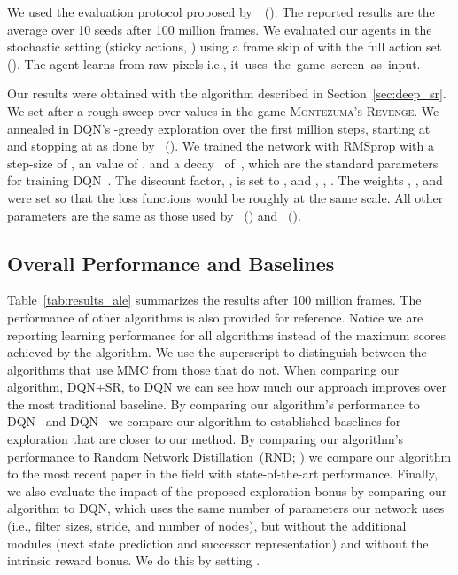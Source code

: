 \documentclass[letterpaper]{article} \usepackage{aaai20}  \usepackage{times}  \usepackage{helvet} \usepackage{courier}  \usepackage[hyphens]{url}  \usepackage{graphicx} \urlstyle{rm} \def\UrlFont{\rm}  \usepackage{graphicx}  \frenchspacing  \setlength{\pdfpagewidth}{8.5in}  \setlength{\pdfpageheight}{11in}  \usepackage{booktabs}
\begin{document}
We used the evaluation protocol proposed by~\citeauthor{Machado18a}~(\citeyear{Machado18a}). The reported results are the average over 10 seeds after 100 million frames. We evaluated our agents in the stochastic setting (sticky actions, ) using a frame skip of  with the full action set (). The agent learns from raw pixels i.e., it~uses~the~game~screen~as~input.

Our results were obtained with the algorithm described in Section~\ref{sec:deep_sr}. We set  after a rough sweep over values in the game \textsc{Montezuma's Revenge}. We annealed  in DQN's -greedy exploration over the first million steps, starting at  and stopping at  as done by \citeauthor{Bellemare16}~(\citeyear{Bellemare16}). We trained the network with RMSprop with a step-size of , an  value of , and a decay~ of~, which are the standard parameters for training DQN~\cite{Mnih15}. The discount factor, , is set to , and , , . The weights  , , and  were set so that the loss functions would be roughly at the same scale. All other parameters are the same as those used by \citeauthor{Mnih15}~(\citeyear{Mnih15}) and \citeauthor{Oh15}~(\citeyear{Oh15}).

\subsection{Overall Performance and Baselines}

Table~\ref{tab:results_ale} summarizes the results after 100 million frames. The performance of other algorithms is also provided for reference. Notice we are reporting learning performance for all algorithms instead of the maximum scores achieved by the algorithm. We use the superscript  to distinguish between the algorithms that use MMC from those that do not. When comparing our algorithm, DQN+SR, to DQN we can see how much our approach improves over the most traditional baseline. By comparing our algorithm's performance to \textsc{DQN}~\cite{Bellemare16} and \textsc{DQN}~\cite{Ostrovski17} we compare our algorithm to established baselines for exploration that are closer to our method. By comparing our algorithm's performance to Random Network Distillation~(RND; \citeauthor{Burda19} \citeyear{Burda19}) we compare our algorithm to the most recent paper in the field with state-of-the-art performance. Finally, we also evaluate the impact of the proposed exploration bonus by comparing our algorithm to DQN, which uses the same number of parameters our network uses (i.e., filter sizes, stride, and number of nodes), but without the additional modules (next state prediction and successor representation) and without the intrinsic reward bonus. We do this by setting .
\end{document}
